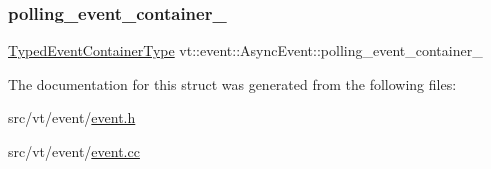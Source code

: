 \subsubsection{\texorpdfstring{polling\+\_\+event\+\_\+container\+\_\+}{polling\_event\_container\_}}
{\footnotesize\ttfamily \hyperlink{structvt_1_1event_1_1_async_event_af0397f32fb9d7dd136c544737eeb7796}{Typed\+Event\+Container\+Type} vt\+::event\+::\+Async\+Event\+::polling\+\_\+event\+\_\+container\+\_\+\hspace{0.3cm}{\ttfamily [private]}}



The documentation for this struct was generated from the following files\+:\begin{DoxyCompactItemize}
\item 
src/vt/event/\hyperlink{event_8h}{event.\+h}\item 
src/vt/event/\hyperlink{event_8cc}{event.\+cc}\end{DoxyCompactItemize}
